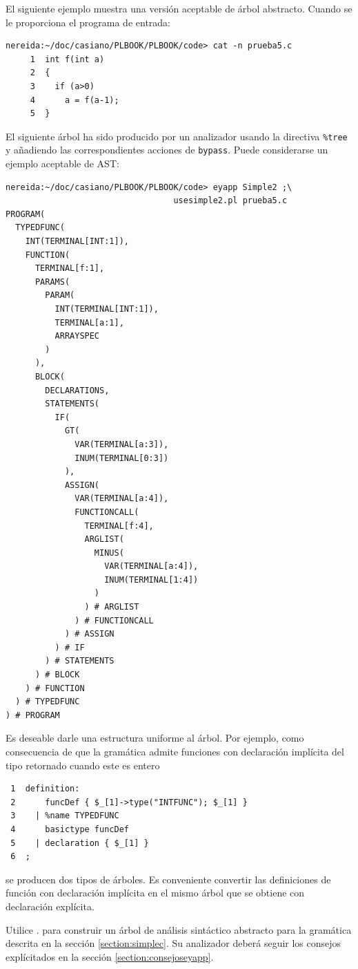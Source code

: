 \begin{enumerate}
El siguiente ejemplo muestra una versión aceptable de árbol abstracto.
Cuando se le proporciona el programa de entrada:

\begin{verbatim}
nereida:~/doc/casiano/PLBOOK/PLBOOK/code> cat -n prueba5.c
     1  int f(int a)
     2  {
     3    if (a>0)
     4      a = f(a-1);
     5  }
\end{verbatim}


El siguiente árbol ha sido producido por un analizador usando la directiva 
\verb|%tree| y añadiendo las correspondientes acciones de \verb|bypass|.
Puede considerarse un ejemplo aceptable de AST:

\begin{verbatim}
nereida:~/doc/casiano/PLBOOK/PLBOOK/code> eyapp Simple2 ;\
                                  usesimple2.pl prueba5.c
PROGRAM(
  TYPEDFUNC(
    INT(TERMINAL[INT:1]),
    FUNCTION(
      TERMINAL[f:1],
      PARAMS(
        PARAM(
          INT(TERMINAL[INT:1]),
          TERMINAL[a:1],
          ARRAYSPEC
        )
      ),
      BLOCK(
        DECLARATIONS,
        STATEMENTS(
          IF(
            GT(
              VAR(TERMINAL[a:3]),
              INUM(TERMINAL[0:3])
            ),
            ASSIGN(
              VAR(TERMINAL[a:4]),
              FUNCTIONCALL(
                TERMINAL[f:4],
                ARGLIST(
                  MINUS(
                    VAR(TERMINAL[a:4]),
                    INUM(TERMINAL[1:4])
                  )
                ) # ARGLIST
              ) # FUNCTIONCALL
            ) # ASSIGN
          ) # IF
        ) # STATEMENTS
      ) # BLOCK
    ) # FUNCTION
  ) # TYPEDFUNC
) # PROGRAM
\end{verbatim}

Es deseable  darle una estructura uniforme al árbol. Por ejemplo, como consecuencia 
de que la gramática admite funciones con declaración implícita del tipo
retornado cuando este es entero

\begin{verbatim}
 1  definition:
 2      funcDef { $_[1]->type("INTFUNC"); $_[1] }
 3    | %name TYPEDFUNC
 4      basictype funcDef
 5    | declaration { $_[1] }
 6  ;
\end{verbatim}
\end{enumerate}

se producen dos tipos de árboles. Es conveniente
convertir las definiciones de función con declaración 
implícita en el mismo árbol que se obtiene con 
declaración explícita. 

\label{practica:esquemadetradsimple}
Utilice 
.
para construir un árbol de análisis sintáctico abstracto 
para la gramática descrita en la sección
\ref{section:simplec}.
Su analizador deberá seguir los consejos explícitados en la 
sección \ref{section:consejoseyapp}.


